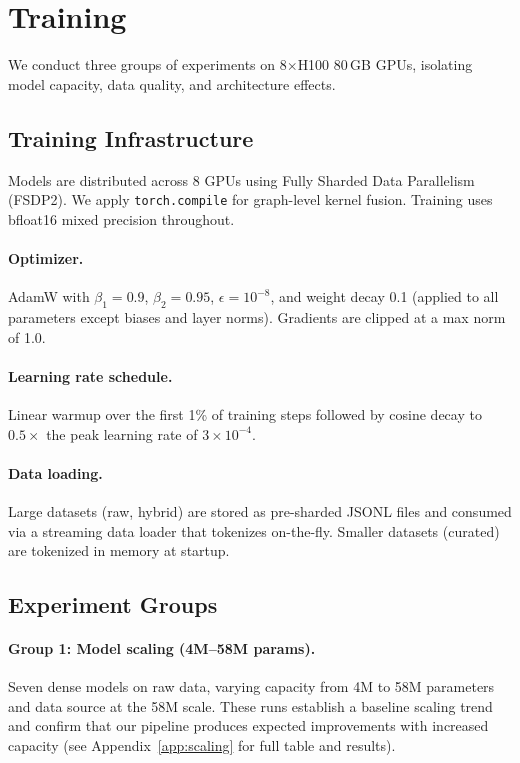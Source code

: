 \documentclass[10pt]{article}
\begin{document}
\section{Training}
\label{sec:training}

We conduct three groups of experiments on 8$\times$H100 80\,GB GPUs, isolating model capacity, data quality, and architecture effects.

\subsection{Training Infrastructure}

Models are distributed across 8 GPUs using Fully Sharded Data Parallelism (FSDP2). We apply \texttt{torch.compile} for graph-level kernel fusion. Training uses bfloat16 mixed precision throughout.

\paragraph{Optimizer.}
AdamW with $\beta_1{=}0.9$, $\beta_2{=}0.95$, $\epsilon{=}10^{-8}$, and weight decay 0.1 (applied to all parameters except biases and layer norms). Gradients are clipped at a max norm of 1.0.

\paragraph{Learning rate schedule.}
Linear warmup over the first 1\% of training steps followed by cosine decay to $0.5\times$ the peak learning rate of $3{\times}10^{-4}$.

\paragraph{Data loading.}
Large datasets (raw, hybrid) are stored as pre-sharded JSONL files and consumed via a streaming data loader that tokenizes on-the-fly. Smaller datasets (curated) are tokenized in memory at startup.

\subsection{Experiment Groups}

\paragraph{Group 1: Model scaling (4M--58M params).}
Seven dense models on raw data, varying capacity from 4M to 58M parameters and data source at the 58M scale. These runs establish a baseline scaling trend and confirm that our pipeline produces expected improvements with increased capacity (see Appendix~\ref{app:scaling} for full table and results).
\end{document}
